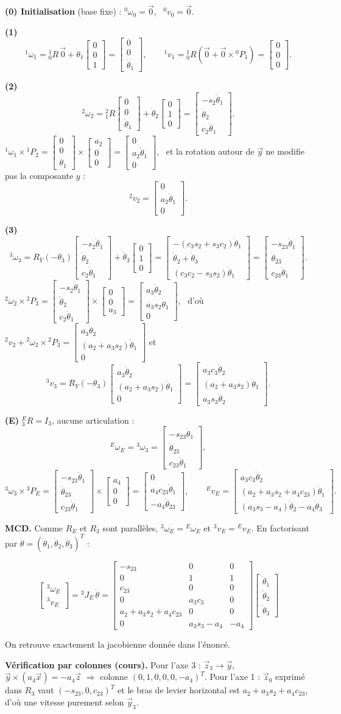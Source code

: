 \documentclass[11pt,a4paper]{article}
\newcommand{\dt}[1]{\dot\theta_{#1}}\newcommand{\ddt}[1]{\ddot\theta_{#1}}
\newcommand{\dtt}{\dot\theta_{23}}\newcommand{\ddtt}{\ddot\theta_{23}}
\newcommand{\col}[3]{\begin{bmatrix}#1\\#2\\#3\end{bmatrix}}
\begin{document}
\textbf{(0) Initialisation} (base fixe) : ${}^0\omega_0=\vec 0$, \ ${}^0v_0=\vec 0$.

\textbf{(1)}
\[{}^1\omega_1={}^1_0R\,\vec 0+\dt1\col001=\col00{\dt1},\qquad {}^1v_1={}^1_0R\left(\vec 0+\vec0\times{}^0P_1\right)=\col000.\]

\textbf{(2)}
\[{}^2\omega_2={}^2_1R\col00{\dt1}+\dt2\col010=\col{-s_2\dt1}{\dt2}{c_2\dt1}.\]
${}^1\omega_1\times{}^1P_2=\col00{\dt1}\times\col{a_2}00=\col0{a_2\dt1}0$, \ et la rotation autour de $\vec y$ ne modifie pas la composante $y$ :
\[{}^2v_2=\col{0}{a_2\dt1}{0}.\]

\textbf{(3)}
\[{}^3\omega_3=R_Y(-\theta_3)\col{-s_2\dt1}{\dt2}{c_2\dt1}+\dt3\col010=\col{-(c_3s_2+s_3c_2)\dt1}{\dt2+\dt3}{(c_3c_2-s_3s_2)\dt1}=\col{-s_{23}\dt1}{\dtt}{c_{23}\dt1}.\]
${}^2\omega_2\times{}^2P_3=\col{-s_2\dt1}{\dt2}{c_2\dt1}\times\col00{a_3}=\col{a_3\dt2}{a_3s_2\dt1}{0}$, \ d'où ${}^2v_2+{}^2\omega_2\times{}^2P_3=\col{a_3\dt2}{(a_2+a_3s_2)\dt1}{0}$ et
\[{}^3v_3=R_Y(-\theta_3)\col{a_3\dt2}{(a_2+a_3s_2)\dt1}{0}=\col{a_3c_3\dt2}{(a_2+a_3s_2)\dt1}{a_3s_3\dt2}.\]

\textbf{(E)} ${}^E_3R=I_3$, aucune articulation :
\[{}^E\omega_E={}^3\omega_3=\col{-s_{23}\dt1}{\dtt}{c_{23}\dt1},\]
\[{}^3\omega_3\times{}^3P_E=\col{-s_{23}\dt1}{\dtt}{c_{23}\dt1}\times\col{a_4}00=\col{0}{a_4c_{23}\dt1}{-a_4\dtt},\qquad
{}^Ev_E=\col{a_3c_3\dt2}{(a_2+a_3s_2+a_4c_{23})\dt1}{(a_3s_3-a_4)\dt2-a_4\dt3}.\]

\textbf{MCD.} Comme $R_E$ et $R_3$ sont parallèles, ${}^3\omega_E={}^E\omega_E$ et ${}^3v_E={}^Ev_E$. En factorisant par $\dot\theta=(\dt1,\dt2,\dt3)^T$ :
\begin{res}
\[\begin{bmatrix}{}^3\omega_E\\{}^3v_E\end{bmatrix}={}^3J_E\,\dot\theta=
\begin{bmatrix}-s_{23}&0&0\\0&1&1\\c_{23}&0&0\\ 0&a_3c_3&0\\a_2+a_3s_2+a_4c_{23}&0&0\\0&a_3s_3-a_4&-a_4\end{bmatrix}\col{\dt1}{\dt2}{\dt3}\]
\end{res}
On retrouve exactement la jacobienne donnée dans l'énoncé.
\begin{rem}
\textbf{Vérification par colonnes (cours).} Pour l'axe 3 : $\vec z_3\to\vec y$, $\vec y\times(a_4\vec x)=-a_4\vec z$ $\Rightarrow$ colonne $(0,1,0,0,0,-a_4)^T$. Pour l'axe 1 : $\vec z_0$ exprimé dans $R_3$ vaut $(-s_{23},0,c_{23})^T$ et le bras de levier horizontal est $a_2+a_3s_2+a_4c_{23}$, d'où une vitesse purement selon $\vec y_3$. 
\end{rem}
\end{document}
